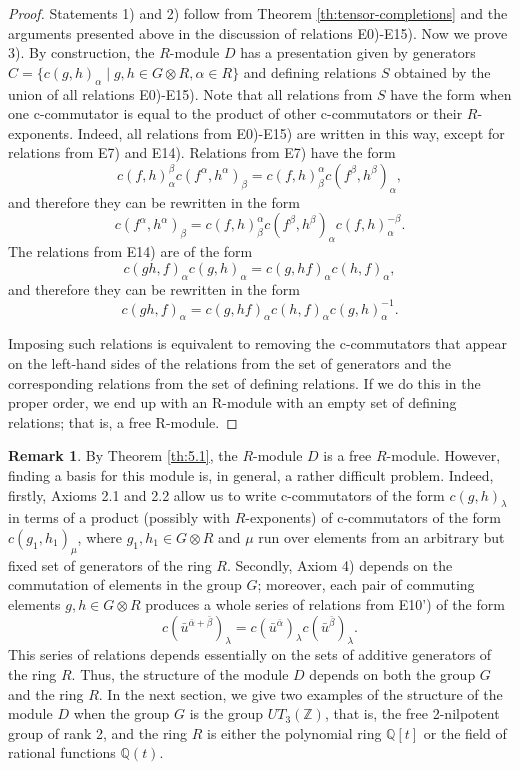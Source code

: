 \documentclass[11pt]{article}
\theoremstyle{definition}
\newtheorem*{remark}{Remark}
\begin{document}
\begin{proof}
    Statements 1) and 2) follow from Theorem \ref{th:tensor-completions} and the arguments presented above in the discussion of relations E0)-E15). Now we prove 3). By construction, the $R$-module $D$ has a presentation given by generators $C= \{c(g,h)_\alpha \mid g, h \in G\otimes R, \alpha \in R\}$ and defining relations $S$ obtained by the union of all relations E0)-E15). Note that all relations from $S$ have the form when one c-commutator is equal to the product of other c-commutators or their $R$-exponents. Indeed, all relations from E0)-E15) are written in this way, except for relations from E7) and E14). Relations from E7) have the form 
    $$
c(f,h)_{\alpha}^{\beta}c(f^{\alpha},h^{\alpha})_{\beta}
    =c(f,h)_{\beta}^{\alpha}c(f^{\beta},h^{\beta})_{\alpha},
$$
and therefore they can be rewritten in the form
 $$
c(f^{\alpha},h^{\alpha})_{\beta}
=c(f,h)_{\beta}^{\alpha}c(f^{\beta},h^{\beta})_{\alpha}c(f,h)_{\alpha}^{-\beta}.
$$
The relations from E14) are of the form
    $$
 c(gh,f)_\alpha c(g,h)_\alpha =c(g,hf)_\alpha c(h,f)_\alpha,
$$
    and therefore they can be rewritten in the form
    $$
 c(gh,f)_\alpha  =c(g,hf)_\alpha c(h,f)_\alpha c(g,h)_\alpha^{-1}.
$$
    
    Imposing such relations is equivalent to removing the c-commutators that appear on the left-hand sides of the relations from the set of generators and the corresponding relations from the set of defining relations. If we do this in the proper order, we end up with an R-module with an empty set of defining relations; that is, a free R-module.
\end{proof}

\begin{remark}
    By Theorem \ref{th:5.1}, the $R$-module $D$ is a free $R$-module. However, finding a basis for this module is, in general, a rather difficult problem. Indeed, firstly, Axioms 2.1 and 2.2 allow us to write c-commutators of the form $c(g,h)_\lambda$ in terms of a product (possibly with $R$-exponents) of c-commutators of the form $c(g_1,h_1)_\mu$, where $g_1,h_1 \in G\otimes R$ and $\mu$ run over elements from an arbitrary but fixed set of generators of the ring $R$. Secondly, Axiom 4) depends on the commutation of elements in the group $G$; moreover, each pair of commuting elements $g,h \in G\otimes R$ produces a whole series of relations from E10') of the form
    $$
    c(\bar u^{\bar \alpha +\bar \beta})_\lambda =  c(\bar u^{\bar \alpha})_\lambda c(\bar u^{\bar \beta})_\lambda.
    $$
    This series of relations depends essentially on the  sets of additive generators of  the ring $R$. Thus, the structure of the module $D$ depends on both the group $G$ and the ring $R$. 
In the next section, we give two examples of the structure of the module $D$ when the group $G$ is the group $UT_3(\mathbb Z)$, that is, the free 2-nilpotent group of rank 2, and the ring $R$ is either the polynomial ring $\mathbb{Q}[t]$ or the field of rational functions $\mathbb{Q}(t)$.
\end{remark}
\end{document}

